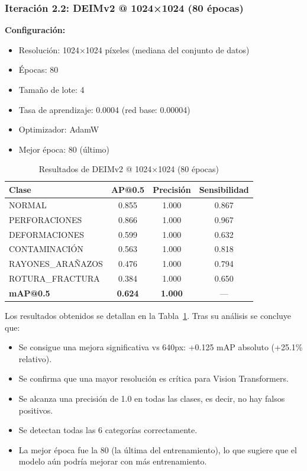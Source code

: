 \subsubsection{Iteración 2.2: DEIMv2 @ 1024×1024 (80 épocas)}
\label{sec:iteracion-deimv2-80ep}

\textbf{Configuración:}
\begin{itemize}
    \item Resolución: 1024×1024 píxeles (mediana del conjunto de datos)
    \item Épocas: 80
    \item Tamaño de lote: 4
    \item Tasa de aprendizaje: 0.0004 (red base: 0.00004)
    \item Optimizador: AdamW
    \item Mejor época: 80 (último)
\end{itemize}

\begin{table}[htbp]
\centering
\begin{tabular}{lccc}
\toprule
\textbf{Clase} & \textbf{AP@0.5} & \textbf{Precisión} & \textbf{Sensibilidad} \\
\midrule
NORMAL & 0.855 & 1.000 & 0.867 \\
PERFORACIONES & 0.866 & 1.000 & 0.967 \\
DEFORMACIONES & 0.599 & 1.000 & 0.632 \\
CONTAMINACIÓN & 0.563 & 1.000 & 0.818 \\
\mbox{RAYONES\_ARAÑAZOS} & 0.476 & 1.000 & 0.794 \\
\mbox{ROTURA\_FRACTURA} & 0.384 & 1.000 & 0.650 \\
\midrule
\textbf{mAP@0.5} & \textbf{0.624} & \textbf{1.000} & --- \\
\bottomrule
\end{tabular}
\caption{Resultados de DEIMv2 @ 1024×1024 (80 épocas)}
\label{tab:deimv2_1024_80ep}
\end{table}

Los resultados obtenidos se detallan en la Tabla~\ref{tab:deimv2_1024_80ep}. Tras su análisis se concluye que:
\begin{itemize}
    \item Se consigue una mejora significativa vs 640px: +0.125 mAP absoluto (+25.1\% relativo).
    \item Se confirma que una mayor resolución es crítica para Vision Transformers.
    \item Se alcanza una precisión de 1.0 en todas las clases, es decir, no hay falsos positivos.
    \item Se detectan todas las 6 categorías correctamente.
    \item La mejor época fue la 80 (la última del entrenamiento), lo que sugiere que el modelo aún podría mejorar con más entrenamiento.
\end{itemize}

